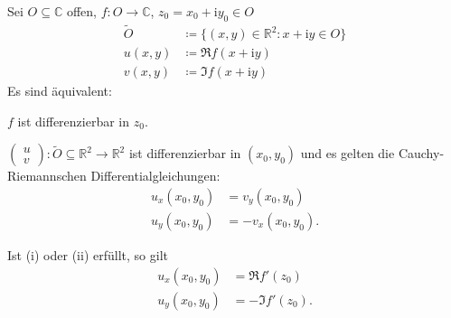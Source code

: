 \begin{theorem}[Satz] \label{thm:2.20}
  Sei $O \subseteq \mathbb{C}$ offen, $f : O \to \mathbb{C}$, $z_0 = x_0 + \mathrm{i} y_0 \in O$
  \begin{align*}
    \widetilde{O} &\coloneq \{(x,y) \in \mathbb{R}^2 : x + \mathrm{i} y \in O\} \\
    u(x,y) &\coloneq \Re f(x + \mathrm{i} y) \\
    v(x,y) &\coloneq \Im f(x + \mathrm{i} y)
  \end{align*}
  Es sind äquivalent:
  \begin{enum-roman}
    \item \label{itm:2.20 i} $f$ ist differenzierbar in $z_0$.
    
    \item \label{itm:2.20 ii} $\begin{pmatrix} u \\ v \end{pmatrix} : \widetilde{O} \subseteq \mathbb{R}^2 \to \mathbb{R}^2$ ist differenzierbar in $(x_0,y_0)$ und es gelten die Cauchy-Riemannschen Differentialgleichungen:
    \begin{align*}
      u_x(x_0,y_0) &= v_y(x_0,y_0) \\
      u_y(x_0,y_0) &= -v_x(x_0,y_0) .
    \end{align*}
  \end{enum-roman}
  Ist (i) oder (ii) erfüllt, so gilt
  \begin{align*}
    u_x(x_0,y_0) &= \Re f'(z_0) \\
    u_y(x_0,y_0) &= - \Im f'(z_0).
  \end{align*}
  

\end{theorem}
